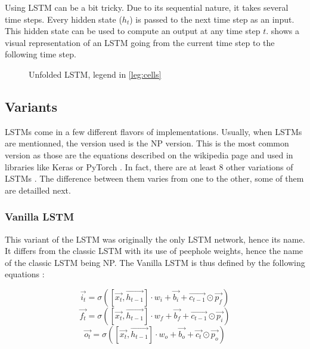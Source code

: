 Using \ac{LSTM} can be a bit tricky. Due to its sequential nature, it takes several time steps. Every hidden state ($h_t$) is passed to the next time step as an input. This hidden state can be used to compute an output at any time step $t$.  shows a visual representation of an \ac{LSTM} going from the current time step to the following time step.

\begin{figure}[H]
  \centering
  
  \caption{Unfolded \acs{LSTM}, legend in \cref{leg:cells}}
  \label{fig:lstmUse}
\end{figure}

\subsection{Variants}

\acp{LSTM} come in a few different flavors of implementations. Usually, when \acp{LSTM} are mentionned, the version used is the \ac{NP} version. This is the most common version as those are the equations described on the wikipedia page \cite{wikiLSTM} and used in libraries like Keras \cite{Keras} or PyTorch \cite{PyTorch}. In fact, there are at least 8 other variations of \acp{LSTM} \cite{nbLSTM}.
The difference between them varies from one to the other, some of them are detailled next.

\subsubsection{Vanilla \acs{LSTM}}
This variant of the \ac{LSTM} was originally the only \ac{LSTM} network, hence its name. It differs from the classic \ac{LSTM} with its use of peephole weights, hence the name of the classic \ac{LSTM} being \acl{NP}. The Vanilla \ac{LSTM} is thus defined by the following equations \cite{vanillaLSTM, nbLSTM} :

\begin{equation}\label{eq:inputGVanilla}
  \overrightarrow{i_t}=\sigma ([\overrightarrow{x_{t}},\overrightarrow{h_{t-1}}]\cdot w_i + \overrightarrow{b_i} +\overrightarrow{c_{t-1}}\odot \overrightarrow{p_f})
\end{equation}
\begin{equation}\label{eq:forgetGVanilla}
  \overrightarrow{f_t}=\sigma ([\overrightarrow{x_{t}},\overrightarrow{h_{t-1}}]\cdot w_f + \overrightarrow{b_f}+\overrightarrow{c_{t-1}}\odot \overrightarrow{p_i})
\end{equation}
\begin{equation}\label{eq:ouputGVanilla}
  \overrightarrow{o_t}=\sigma ([\overrightarrow{x_{t}},\overrightarrow{h_{t-1}}]\cdot w_o + \overrightarrow{b_o}+\overrightarrow{c_{t}}\odot \overrightarrow{p_o})
\end{equation}


